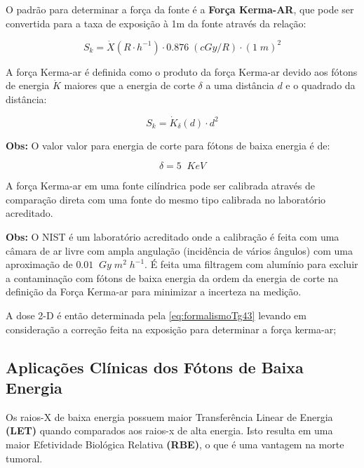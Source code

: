 \documentclass[11pt,a4paper]{article}
\begin{document}
			O padrão para determinar a força da fonte é a \textbf{\textcolor{CarnationPink}{Força Kerma-AR}}, que pode ser convertida para a taxa de exposição à 1m da fonte através da relação:

				\begin{equation}
					S_k = \dot{X}(R \cdot h^{-1}) \cdot 0.876 \; (cGy/R) \cdot (1 \; m)^2
				\end{equation}
			
			A força Kerma-ar é definida como o produto da força Kerma-ar devido aos fótons de energia $\dot{K}$ maiores que a energia de corte $\delta$ a uma distância $d$ e o quadrado da distância:

				\begin{equation}
					S_k = \dot{K}_\delta (d) \cdot d^2
				\end{equation}

				\textbf{\textcolor{CarnationPink}{Obs:} } O valor valor para energia de corte para fótons de baixa energia é de:

				$$\delta = 5 \; \; KeV$$
				
			A força Kerma-ar em uma fonte cilíndrica pode ser calibrada através de comparação direta com uma fonte do mesmo tipo calibrada no laboratório acreditado.

			\textbf{\textcolor{CarnationPink}{Obs:}} O NIST é um laboratório acreditado onde a calibração é feita com uma câmara de ar livre com ampla angulação (incidência de vários ângulos) com uma aproximação de $0.01 \; \; Gy \; m^2 \; h^{-1}$. É feita uma filtragem com alumínio para excluir a contaminação com fótons de baixa energia da ordem da energia de corte na definição da Força Kerma-ar para minimizar a incerteza na medição.

			A dose 2-D é então determinada pela   \ref{eq:formalismoTg43} levando em consideração a correção feita na exposição para determinar a força kerma-ar;

		\subsection{Aplicações Clínicas dos Fótons de Baixa Energia}

			Os raios-X de baixa energia possuem maior Transferência Linear de Energia \textbf{\textcolor{CarnationPink}{(LET)}} quando comparados aos raios-x de alta energia. Isto resulta em uma maior Efetividade Biológica Relativa \textbf{\textcolor{CarnationPink}{(RBE)}}, o que é uma vantagem na morte tumoral.
\end{document}
